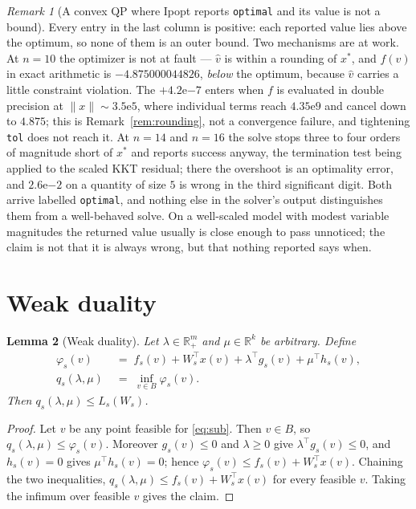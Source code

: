 \documentclass[11pt]{article}
\theoremstyle{plain}
\newtheorem{lemma}{Lemma}
\theoremstyle{remark}
\newtheorem{remark}[lemma]{Remark}
\newcommand{\R}{\mathbb{R}}
\newcommand{\W}{W}
\newcommand{\vhat}{\hat{v}}
\begin{document}
\begin{remark}[A convex QP where Ipopt reports \texttt{optimal} and its value is
not a bound]
Every entry in the last column is positive: each reported value lies above the
optimum, so none of them is an outer bound.  Two mechanisms are at work.  At
$n=10$ the optimizer is not at fault --- $\vhat$ is within a rounding of
$x^{*}$, and $f(\vhat)$ in exact arithmetic is $-4.875000044826$, \emph{below}
the optimum, because $\vhat$ carries a little constraint violation.  The
$+4.2\mathrm{e}{-7}$ enters when $f$ is evaluated in double precision at
$\|x\| \sim 3.5\mathrm{e}5$, where individual terms reach $4.35\mathrm{e}9$ and
cancel down to $4.875$; this is Remark~\ref{rem:rounding}, not a convergence
failure, and tightening \texttt{tol} does not reach it.  At $n = 14$ and
$n = 16$ the solve stops three to four orders of magnitude short of $x^{*}$ and
reports
success anyway, the termination test being applied to the scaled KKT residual;
there the overshoot is an optimality error, and $2.6\mathrm{e}{-2}$ on a
quantity of size $5$ is wrong in the third significant digit.  Both arrive
labelled \texttt{optimal}, and nothing else in the solver's output distinguishes
them from a well-behaved solve.  On a well-scaled model with modest variable
magnitudes the returned value usually is close enough to pass unnoticed; the
claim is not that it is always wrong, but that nothing reported says when.
\end{remark}

\section{Weak duality}

\begin{lemma}[Weak duality]\label{lem:weak}
Let $\lambda \in \R^{m}_{+}$ and $\mu \in \R^{k}$ be arbitrary.  Define
\begin{align}
  \varphi_s(v) &\;=\; f_s(v) + \W_s^{\top} x(v)
                     + \lambda^{\top} g_s(v) + \mu^{\top} h_s(v),
     \label{eq:phi}\\
  q_s(\lambda,\mu) &\;=\; \inf_{v \in B} \varphi_s(v).
     \label{eq:q}
\end{align}
Then $q_s(\lambda,\mu) \le L_s(\W_s)$.
\end{lemma}

\begin{proof}
Let $v$ be any point feasible for \eqref{eq:sub}.  Then $v \in B$, so
$q_s(\lambda,\mu) \le \varphi_s(v)$.  Moreover $g_s(v) \le 0$ and $\lambda \ge 0$
give $\lambda^{\top} g_s(v) \le 0$, and $h_s(v) = 0$ gives
$\mu^{\top} h_s(v) = 0$; hence
$\varphi_s(v) \le f_s(v) + \W_s^{\top} x(v)$.  Chaining the two inequalities,
$q_s(\lambda,\mu) \le f_s(v) + \W_s^{\top} x(v)$ for every feasible $v$.  Taking
the infimum over feasible $v$ gives the claim.
\end{proof}
\end{document}

